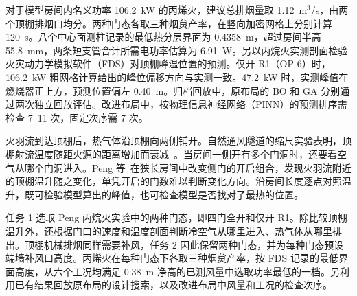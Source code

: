 对于模型房间内名义功率 106.2~kW 的丙烯火，建议总排烟量取 1.12~m$^3$/s，由两个顶棚排烟口均分。两种门态各取三种烟炱产率，在竖向加密网格上分别计算 120~s。八个中心面测柱记录的最低热分层界面为 0.4358~m，超过房间半高 55.8~mm，两条短支管合计所需电功率估算为 6.91~W。另以丙烷火实测剖面检验火灾动力学模拟软件（FDS）对顶棚峰温位置的预测。仅开 R1（OP-6）时，106.2~kW 粗网格计算给出的峰位偏移方向与实测一致。47.2~kW 时，实测峰值在燃烧器正上方，预测位置偏左 0.40~m。归档回放中，原布局的 BO 和 GA 分别通过两次独立回放评估。改进布局中，按物理信息神经网络（PINN）的预测排序需检查 7--11 次，固定次序需 7 次。

火羽流到达顶棚后，热气体沿顶棚向两侧铺开。自然通风隧道的缩尺实验表明，顶棚射流温度随距火源的距离增加而衰减~\cite{tunnel}。当房间一侧开有多个门洞时，还要看空气从哪个门洞进入。Peng 等~\cite{peng}在狭长房间中改变侧门的开启组合，发现火羽流附近的顶棚温升随之变化，单凭开启的门数难以判断变化方向。沿房间长度逐点对照温升，既可检验模型算出的峰值，也可检查模型是否找对了最热的位置。

任务 1 选取 Peng 丙烷火实验中的两种门态，即四门全开和仅开 R1。除比较顶棚温升外，还根据门口的速度和温度剖面判断冷空气从哪里进入、热气体从哪里排出。顶棚机械排烟同样需要补风，任务 2 因此保留两种门态，并为每种门态预设端墙补风口高度。丙烯火在每种门态下各取三种烟炱产率，按 FDS 记录的最低界面高度，从六个工况均满足 0.38~m 净高的已测风量中选取功率最低的一档。另利用已有结果回放原布局的设计搜索，以及改进布局中风量和工况的检查次序。
